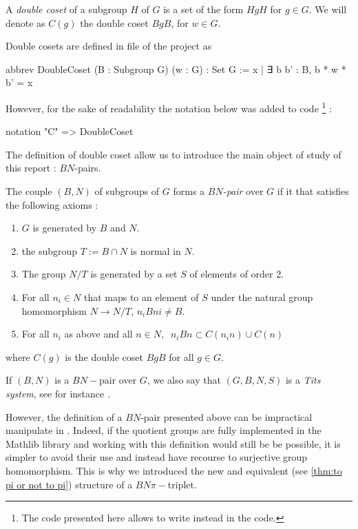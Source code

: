 \begin{definition} \label{def:DC}
    A \emph{double coset} of a subgroup $H$ of $G$ is a set of the form $HgH$ for $g \in G$. We  will denote as $C\left( g \right)$ the double coset $BgB$, for $w \in G$. \end{definition} 

    Double cosets are defined in  file of the project as
    \begin{leancode}
abbrev DoubleCoset (B : Subgroup G) (w : G) : Set G := 
    {x | ∃ b  b' : B, b * w * b' = x}
    \end{leancode} 
    However, for the sake of readability the notation below was added to code \footnote{The code presented here allows to write  instead  in the code.} :
\begin{leancode}
notation "C"  => DoubleCoset 
\end{leancode}

The definition of double coset allow us to introduce the main object of study of this report : $BN$-pairs.
\begin{definition}[$BN$-pair] \label{BN}
    The couple $\left( B,N \right)$ of subgroups of $G$ forms a \emph{$BN$-pair} over $G$ if it that satisfies the following axioms :
    \begin{enumerate}
        \item $G$ is generated by $B$ and $N$.
        \item the subgroup $T := B \cap N$ is normal in $N$.
        \item The group $N / T$ is generated by a set $S$ of elements of order 2.
        \item For all $n_{i} \in N$ that maps to an element of $S$ under the natural group homomorphism $N \to N / T$, $n_{i}Bni \neq B$.
        \item For all $n_{i}$ as above and all $n \in N, \ $ $n_i B n \subset C(n_in) \cup C(n)$
    \end{enumerate} where $C(g)$ is the double coset $BgB$ for all $g \in G$.
\end{definition}


\begin{notation}
    If $\left( B,N \right)$ is a $BN-$pair over $G$, we also say that $\left( G, B, N, S \right)$ is a \emph{Tits system}, see for instance \cite{bourbaki_groupes_2007}.
\end{notation}


However, the definition of a $BN$-pair presented above can be impractical manipulate in \Lean. Indeed, if the quotient groups are fully implemented in the Mathlib library and working with this definition would still be be possible, it is simpler to avoid their use and instead have recourse to surjective group homomorphism. 
    This is why we introduced the new and equivalent (see \ref{thm:to pi or not to pi}) structure of a $BN\pi-$triplet.  %

